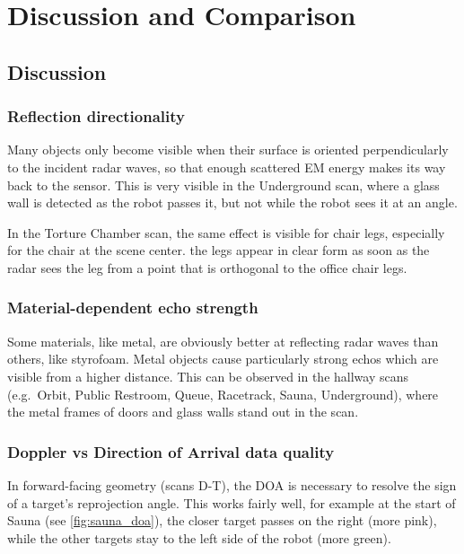 \chapter{Discussion and Comparison}\label{discussion-and-comparison}

\section{Discussion}

\subsection{Reflection directionality}\label{reflection-directionality}

Many objects only become visible when their surface is oriented
perpendicularly to the incident radar waves, so that enough scattered EM
energy makes its way back to the sensor. This is very visible in the
Underground scan, where a glass wall is detected as the robot passes it,
but not while the robot sees it at an angle.

In the Torture Chamber scan, the same effect is visible for chair legs,
especially for the chair at the scene center. the legs appear in clear
form as soon as the radar sees the leg from a point that is orthogonal
to the office chair legs.



\subsection{Material-dependent echo strength}\label{material-dependent-echo-strength}

Some materials, like metal, are obviously better at reflecting radar
waves than others, like styrofoam. Metal objects cause particularly
strong echos which are visible from a higher distance. This can be
observed in the hallway scans (e.g.~Orbit, Public Restroom, Queue,
Racetrack, Sauna, Underground), where the metal frames of doors and
glass walls stand out in the scan.

\subsection{Doppler vs Direction of Arrival data quality}\label{doppler-vs-direction-of-arrival-data-quality}

In forward-facing geometry (scans D-T), the DOA is necessary to resolve
the sign of a target's reprojection angle. This works fairly well, for
example at the start of Sauna (see \cref{fig:sauna_doa}), the closer target
passes on the right (more pink), while the other targets stay to the
left side of the robot (more green).

